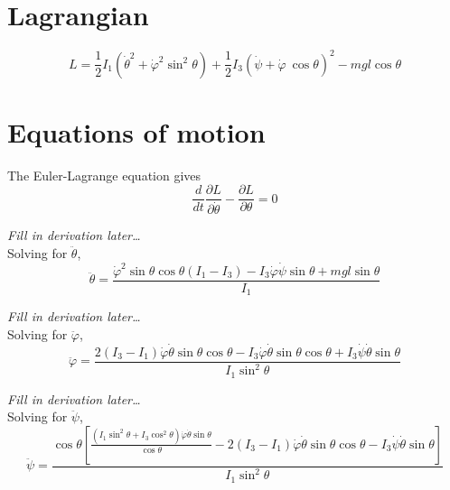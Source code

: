 \documentclass{report}
\begin{document}
\section{Lagrangian}

\begin{equation}
  L = \frac{1}{2} I_1 \left( \dot{\theta}^2 + \dot{\varphi}^2 \sin^2\theta \right) + \frac{1}{2} I_3 \left( \dot{\psi} + \dot{\varphi}\ \cos\theta \right)^2 - mgl \cos\theta
\end{equation}

\section{Equations of motion}

The Euler-Lagrange equation gives
\begin{equation}
  \frac{d}{dt} \frac{\partial L}{\partial \dot{\theta}} - \frac{\partial L}{\partial \theta} = 0
\end{equation}

\textit{Fill in derivation later\dots} \\

Solving for $\ddot{\theta}$,
\begin{equation}
  \ddot{\theta} = \frac{\dot{\varphi}^2 \sin\theta \cos\theta(I_1 - I_3) - I_3 \dot{\varphi} \dot{\psi} \sin\theta + mgl \sin\theta}{I_1}
\end{equation}

\textit{Fill in derivation later\dots} \\

Solving for $\ddot{\varphi}$,
\begin{equation}
  \ddot{\varphi} = \frac{2(I_3 - I_1) \dot{\varphi} \dot\theta \sin\theta \cos\theta - I_3 \dot{\varphi} \dot{\theta} \sin\theta \cos\theta + I_3 \dot{\psi} \dot\theta \sin\theta}{I_1 \sin^2\theta}
\end{equation}

\textit{Fill in derivation later\dots} \\

Solving for $\ddot{\psi}$,
\begin{equation}
  \ddot{\psi} = \frac{\cos\theta \left[ \frac{(I_1 \sin^2\theta + I_3 \cos^2\theta) \dot{\varphi} \dot{\theta} \sin\theta}{\cos\theta} - 2(I_3 - I_1) \dot{\varphi} \dot{\theta} \sin\theta \cos\theta - I_3 \dot{\psi} \dot{\theta} \sin\theta \right]}{I_1 \sin^2\theta}
\end{equation}
\end{document}
